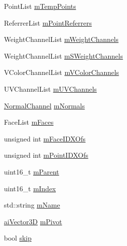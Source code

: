 \begin{DoxyCompactItemize}
\item 
Point\+List \hyperlink{struct_assimp_1_1_l_w_o_1_1_layer_afb5e709f554e9f4bd54bba5e4d91c08e}{m\+Temp\+Points}
\item 
Referrer\+List \hyperlink{struct_assimp_1_1_l_w_o_1_1_layer_ab8b296c432079a0ee835be21ba6abc4f}{m\+Point\+Referrers}
\item 
Weight\+Channel\+List \hyperlink{struct_assimp_1_1_l_w_o_1_1_layer_ab23b1fad6b5684399a082c6ffce1eee8}{m\+Weight\+Channels}
\item 
Weight\+Channel\+List \hyperlink{struct_assimp_1_1_l_w_o_1_1_layer_ad7fc10e3e40c6adea77dfeccb833fb61}{m\+S\+Weight\+Channels}
\item 
V\+Color\+Channel\+List \hyperlink{struct_assimp_1_1_l_w_o_1_1_layer_a641f7d01eea957b1f4fa9e272ae95679}{m\+V\+Color\+Channels}
\item 
U\+V\+Channel\+List \hyperlink{struct_assimp_1_1_l_w_o_1_1_layer_a39ecd29f0e58d8898c9213d7e201b88d}{m\+U\+V\+Channels}
\item 
\hyperlink{struct_assimp_1_1_l_w_o_1_1_normal_channel}{Normal\+Channel} \hyperlink{struct_assimp_1_1_l_w_o_1_1_layer_ad0f4a899482d0ed02defdc88beee9461}{m\+Normals}
\item 
Face\+List \hyperlink{struct_assimp_1_1_l_w_o_1_1_layer_a5218ce3bb5552e4e7dab9510f6324be9}{m\+Faces}
\item 
unsigned int \hyperlink{struct_assimp_1_1_l_w_o_1_1_layer_a9aff9f3132ceec8b12dfc8f5681d8f86}{m\+Face\+I\+D\+X\+Ofs}
\item 
unsigned int \hyperlink{struct_assimp_1_1_l_w_o_1_1_layer_a8ce2442b34e0b75f32bf33974c358029}{m\+Point\+I\+D\+X\+Ofs}
\item 
uint16\+\_\+t \hyperlink{struct_assimp_1_1_l_w_o_1_1_layer_ae2256c4409c6ba4bbc14fcd614cf680b}{m\+Parent}
\item 
uint16\+\_\+t \hyperlink{struct_assimp_1_1_l_w_o_1_1_layer_ab4323f40fb04e78164194340c283d0f4}{m\+Index}
\item 
std\+::string \hyperlink{struct_assimp_1_1_l_w_o_1_1_layer_a3bfa18df0c9b77be857aba7cc1d7b09d}{m\+Name}
\item 
\hyperlink{structai_vector3_d}{ai\+Vector3\+D} \hyperlink{struct_assimp_1_1_l_w_o_1_1_layer_ab40e9864853c0c8e8b16a88c3d297b4b}{m\+Pivot}
\item 
bool \hyperlink{struct_assimp_1_1_l_w_o_1_1_layer_af9375f0d0329e8c45492eba00d2d4443}{skip}
\end{DoxyCompactItemize}


